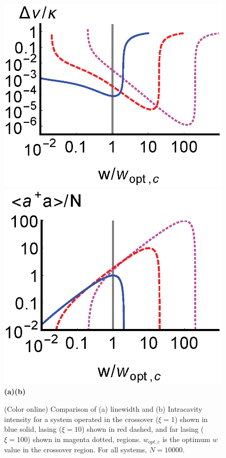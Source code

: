 \documentclass[aps,prl,twocolumn,
superscriptaddress,groupedaddress]{revtex4}
\begin{document}
\begin{figure}
\begin{center}
	\includegraphics[scale =0.42] {LinewidthComparison.eps}
	\hspace{-4.5mm} \includegraphics[scale =0.42] {adaComparison.eps}\\
	\hspace{-3mm}\textbf{(a)}\hspace{37mm}\textbf{(b)} \hspace{35mm}
\end{center}
		\vspace{-5mm}
\caption{(Color online) Comparison of (a) linewidth and (b) Intracavity
intensity for a system operated in the crossover ($\xi=1$) shown in blue
solid, lasing ($\xi=10$) shown in red dashed, and far lasing ($\xi=100$)
shown in magenta dotted, regions. $w_{opt,c}$ is the optimum $w$ value
in the crossover region. For all systems, $N=10000$.}
\label{LWadaComparison}
\end{figure}
\end{document}
